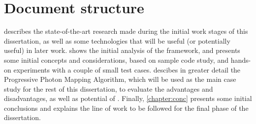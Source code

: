 \documentclass[main.tex]{subfiles}
\begin{document}
\section{Document structure}


 describes the state-of-the-art research made during the initial work stages of this dissertation, as well as some technologies that will be useful (or potentially useful) in later work.  shows the initial analysis of the \gama framework, and presents some initial concepts and considerations, based on sample code study, and hands-on experiments with a couple of small test cases.  descibes in greater detail the Progressive Photon Mapping Algorithm, which will be used as the main case study for the rest of this dissertation, to evaluate the advantages and disadvantages, as well as potential of \gama. Finally, \cref{chapter:conc} presents some initial conclusions and explains the line of work to be followed for the final phase of the dissertation.
\end{document}
